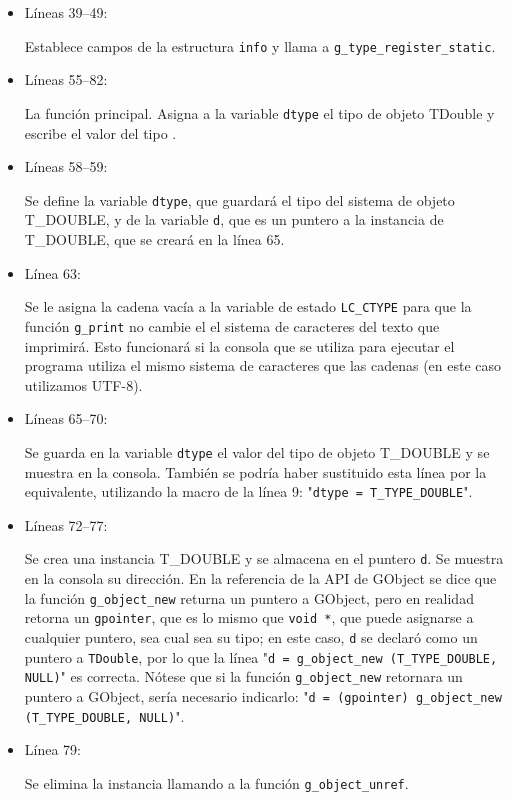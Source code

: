 \begin{itemize}
\item Líneas 39--49:\par
  Establece campos de la estructura \texttt{info} y llama a \texttt{g\_type\_register\_static}.
\item Líneas 55--82:\par
  La función principal. Asigna a la variable \texttt{dtype} el tipo de objeto \textsf{TDouble} y escribe el valor
  del tipo .
\item Líneas 58--59:\par
  Se define la variable \texttt{dtype}, que guardará el tipo del sistema de objeto \textsf{T\_DOUBLE}, y de la
  variable \texttt{d}, que es un puntero a la instancia de \textsf{T\_DOUBLE}, que se creará en la línea 65.
\item Línea 63:\par
  Se le asigna la cadena vacía a la variable de estado \texttt{LC\_CTYPE} para que la función
  \texttt{g\_print} no cambie el el sistema de caracteres del texto que imprimirá.
  Esto funcionará si la consola que se utiliza para ejecutar el programa utiliza el mismo sistema de caracteres
  que las cadenas (en este caso utilizamos UTF-8).
\item Líneas 65--70:\par
  Se guarda en la variable \texttt{dtype} el valor del tipo de objeto \textsf{T\_DOUBLE} y se muestra en la consola.
  También se podría haber sustituido esta línea por la equivalente, utilizando la macro de la línea 9:
  "\texttt{dtype = T\_TYPE\_DOUBLE}".
\item Líneas 72--77:\par
  Se crea una instancia \textsf{T\_DOUBLE} y se almacena en el puntero \texttt{d}. Se muestra en la consola su
  dirección. En la referencia de la API de \textsf{GObject} se dice que la función
  \texttt{g\_object\_new} returna un puntero a \textsf{GObject}, pero en realidad retorna un
  \texttt{gpointer}, que es lo mismo que \texttt{void *}, que puede asignarse a cualquier puntero, sea cual sea
  su tipo; en este caso, \texttt{d} se declaró como un puntero a \texttt{TDouble}, por lo que la línea
  "\texttt{d = g\_object\_new (T\_TYPE\_DOUBLE, NULL)}" es correcta. Nótese que si la función
  \texttt{g\_object\_new} retornara un puntero a \textsf{GObject}, sería necesario indicarlo:
  "\texttt{d = (gpointer) g\_object\_new (T\_TYPE\_DOUBLE, NULL)}".
\item Línea 79:\par
  Se elimina la instancia llamando a la función \texttt{g\_object\_unref}.
\end{itemize}

